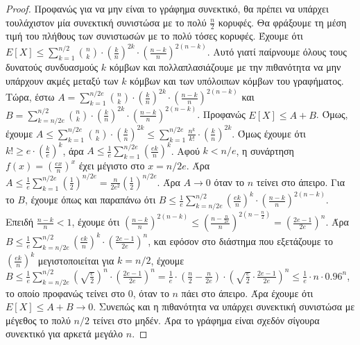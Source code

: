 \documentclass[a4paper, oneside, 11pt]{article}
\theoremstyle{definition}
\begin{document}
\begin{enumerate}
   \begin{proof}
Προφανώς για να μην είναι το γράφημα συνεκτικό, θα πρέπει να υπάρχει τουλάχιστον μία συνεκτική συνιστώσα με το πολύ $\frac{n}{2}$ κορυφές. Θα φράξουμε τη μέση τιμή του πλήθους των συνιστωσών με το πολύ
τόσες κορυφές. Έχουμε ότι $E[X] \leq \sum_{k=1}^{n/2} {n \choose k} \cdot (\frac{k}{n})^{2k} \cdot (\frac{n-k}{n})^{2(n-k)}$. Αυτό γιατί παίρνουμε όλους τους δυνατούς συνδυασμούς $k$ κόμβων και
πολλαπλασιάζουμε με την πιθανότητα να μην υπάρχουν ακμές μεταξύ των $k$ κόμβων και των υπόλοιπων κόμβων του γραφήματος. Τώρα, έστω $A = \sum_{k=1}^{n/2e} {n\choose k} \cdot (\frac{k}{n})^{2k}
 \cdot (\frac{n-k}{n})^{2(n-k)}$ και $B = \sum_{k=n/2e}^{n/2} {n\choose k} \cdot (\frac{k}{n})^{2k}
 \cdot (\frac{n-k}{n})^{2(n-k)}$.
Προφανώς $E[X] \leq A + B$. Όμως, έχουμε $A \leq \sum_{k=1}^{n/2e} {n\choose k} \cdot (\frac{k}{n})^{2k} \leq \sum_{k=1}^{n/2e} \frac{n^k}{k!} \cdot (\frac{k}{n})^{2k}$. Όμως έχουμε ότι $k! \geq e \cdot
(\frac{k}{e})^k$, άρα $A \leq \frac{1}{e} \sum_{k=1}^{n/2e} (\frac{ek}{n})^k$. Αφού $k<n/e$, η συνάρτηση $f(x) = (\frac{ex}{n})^x$ έχει μέγιστο στο $x=n/2e$. Άρα $A \leq  \frac{1}{e} \sum_{k=1}^{n/2e}
(\frac{1}{2})^{n/2e} = \frac{n}{2e^2} (\frac{1}{2})^{n/2e}$. Άρα $A\rightarrow 0$ όταν το $n$ τείνει στο άπειρο.
Για το $B$, έχουμε όπως και παραπάνω ότι $B\leq \frac{1}{e} \sum_{k=n/2e}^{n/2} (\frac{ek}{n})^k \cdot (\frac{n-k}{n})^{2(n-k)}$. Επειδή $\frac{n-k}{n}<1$, έχουμε ότι $(\frac{n-k}{n})^{2(n-k)}
\leq (\frac{n-\frac{n}{2e}}{n})^{2(n-\frac{n}{2})} = (\frac{2e-1}{2e})^n$. Άρα $B \leq \frac{1}{e} \sum_{k=n/2e}^{n/2} (\frac{ek}{n})^k \cdot (\frac{2e-1}{2e})^n$, και εφόσον στο διάστημα που εξετάζουμε
το $(\frac{ek}{n})^k$ μεγιστοποιείται για $k=n/2$, έχουμε $B \leq \frac{1}{e} \sum_{k=n/2e}^{n/2} (\sqrt{\frac{e}{2}})^n \cdot (\frac{2e-1}{2e})^n = \frac{1}{e} \cdot (\frac{n}{2} - \frac{n}{2e}) \cdot
(\sqrt{\frac{e}{2}}\cdot \frac{2e-1}{2e})^n \leq \frac{1}{e} \cdot n \cdot 0.96^n$, το οποίο προφανώς τείνει στο 0, όταν το $n$ πάει στο άπειρο. Άρα έχουμε ότι $E[X]\leq A + B \rightarrow 0$. Συνεπώς
και η πιθανότητα να υπάρχει συνεκτική συνιστώσα με μέγεθος το πολύ $n/2$ τείνει στο μηδέν. Άρα το γράφημα είναι σχεδόν σίγουρα συνεκτικό για αρκετά μεγάλο $n$.


   \end{proof}

\end{enumerate}
\end{document}
